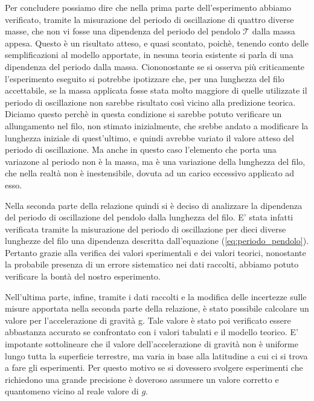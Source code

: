 Per concludere possiamo dire che nella prima parte dell'esperimento abbiamo verificato, tramite la misurazione del periodo di oscillazione di quattro diverse masse, che non vi fosse una dipendenza del periodo del pendolo $\mathcal{T}$ dalla massa appesa. Questo è un risultato atteso, e quasi scontato, poichè, tenendo conto delle semplificazioni al modello apportate, in nesuna teoria esistente si parla di una dipendenza del periodo dalla massa. Ciononostante se si osserva più criticamente l'esperimento eseguito si potrebbe ipotizzare che, per una lunghezza del filo accettabile, se la massa applicata fosse stata molto maggiore di quelle utilizzate il periodo di oscillazione non sarebbe risultato così vicino alla predizione teorica. Diciamo questo perchè in questa condizione si sarebbe potuto verificare un allungamento nel filo, non stimato inizialmente, che srebbe andato a modificare la lunghezza iniziale di quest'ultimo, e quindi avrebbe variato il valore atteso del periodo di oscillazione. Ma anche in questo caso l'elemento che porta una variazone al periodo non è la massa, ma è una variazione della lunghezza del filo, che nella realtà non è inestensibile, dovuta ad un carico eccessivo applicato ad esso.

Nella seconda parte della relazione quindi si è deciso di analizzare la dipendenza del periodo di oscillazione del pendolo dalla lunghezza del filo. E' stata infatti verificata tramite la misurazione del periodo di oscillazione per dieci diverse lunghezze del filo una dipendenza descritta dall'equazione (\ref{eq:periodo_pendolo}). Pertanto grazie alla verifica dei valori sperimentali e dei valori teorici, nonostante la probabile presenza di un errore sistematico nei dati raccolti, abbiamo potuto verificare la bontà del nostro esperimento.

Nell'ultima parte, infine, tramite i dati raccolti e la modifica delle incertezze sulle misure apportata nella seconda parte della relazione, è stato possibile calcolare un valore per l'accelerazione di gravità g. Tale valore è stato poi verificato essere abbastanza accurato se confrontato con i valori tabulati e il modello teorico. E' impotante sottolineare che il valore dell'accelerazione di gravità non è uniforme lungo tutta la superficie terrestre, ma varia in base alla latitudine a cui ci si trova a fare gli esperimenti. Per questo motivo se si dovessero svolgere esperimenti che richiedono una grande precisione è doveroso assumere un valore corretto e quantomeno vicino al reale valore di $g$.
